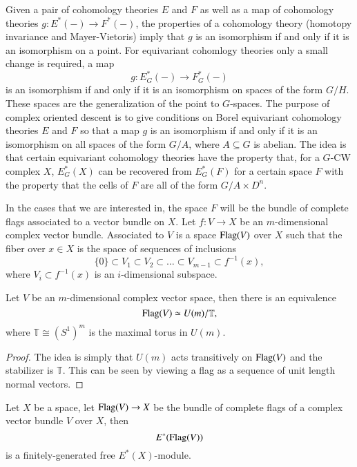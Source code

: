 Given a pair of cohomology theories $E$ and $F$ as well as a map of cohomology theories $g \colon E^*(-) \rightarrow F^*(-)$, the properties of a cohomology theory (homotopy invariance and Mayer-Vietoris) imply that $g$ is an isomorphism if and only if it is an isomorphism on a point. For equivariant cohomlogy theories only a small change is required, a map
\[
g \colon E_{G}^*(-) \rightarrow F_{G}^{*}(-)
\]
is an isomorphism if and only if it is an isomorphism on spaces of the form $G/H$. These spaces are the generalization of the point to $G$-spaces. The purpose of complex oriented descent is to give conditions on Borel equivariant cohomology theories $E$ and $F$ so that a map $g$ is an isomorphism if and only if it is an isomorphism on all spaces of the form $G/A$, where $A \subseteq G$ is abelian. The idea is that certain equivariant cohomology theories have the property that, for a $G$-CW complex $X$, $E_{G}^*(X)$ can be recovered from $E_{G}^*(F)$ for a certain space $F$ with the property that the cells of $F$ are all of the form $G/A \times D^n$.

In the cases that we are interested in, the space $F$ will be the bundle of complete flags associated to a vector bundle on $X$. Let $f \colon V \rightarrow X$ be an $m$-dimensional complex vector bundle. Associated to $V$ is a space $\operatorname{Flag}(V)$ over $X$ such that the fiber over $x \in X$ is the space of sequences of inclusions
\[
\{0\} \subset V_1 \subset V_2 \subset \ldots \subset V_{m-1} \subset f^{-1}(x),
\]
where $V_i \subset f^{-1}(x)$ is an $i$-dimensional subspace.

\begin{lemma}
Let $V$ be an $m$-dimensional complex vector space, then there is an equivalence
\[
\operatorname{Flag}(V) \simeq U(m)/\mathbb{T},
\]
where $\mathbb{T} \cong (S^1)^m$ is the maximal torus in $U(m)$.
\end{lemma}
\begin{proof}
The idea is simply that $U(m)$ acts transitively on $\operatorname{Flag}(V)$ and the stabilizer is $\mathbb{T}$. This can be seen by viewing a flag as a sequence of unit length normal vectors.
\end{proof}


\begin{proposition} \label{finitefreeflags}
Let $X$ be a space, let $\operatorname{Flag}(V) \rightarrow X$ be the bundle of complete flags of a complex vector bundle $V$ over $X$, then
\[
E^*(\operatorname{Flag}(V))
\]
is a finitely-generated free $E^*(X)$-module.
\end{proposition}


